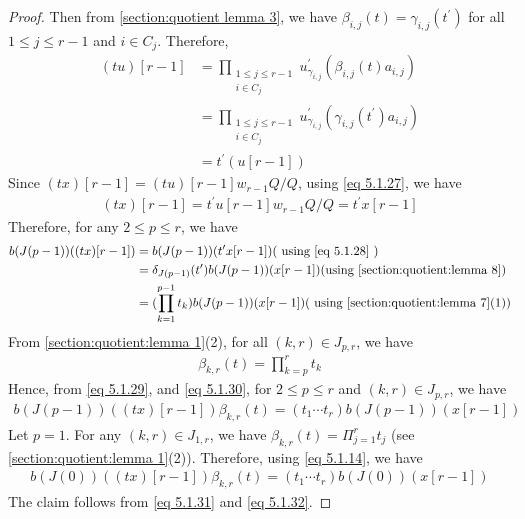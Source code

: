 \documentclass[12pt,reqno]{amsart}
\numberwithin{equation}{section}
\theoremstyle{definition}
\begin{document}
\begin{proof}
		Then from \cref{section:quotient lemma 3}, we have $\beta_{i,j}(t)=\gamma_{i,j}(t^{\prime})$ for all  $1\leq j\leq r-1$ and $i\in C_{j}$.
		Therefore, \begin{align}
			(tu)[r-1]&=\displaystyle\prod_{\substack{1\leq j\leq r-1\\i\in C_{j}}}u^{\prime}_{\gamma_{i,j}}(\beta_{i,j}(t)a_{i,j})\\
			&=\displaystyle\prod_{\substack{1\leq j\leq r-1\\i\in C_{j}}}u^{\prime}_{\gamma_{i,j}}(\gamma_{i,j}(t^{\prime})a_{i,j})\\
			&=t^{\prime}(u[r-1])\label{eq 5.1.27}
		\end{align}
		Since $(tx)[r-1]=(tu)[r-1]w_{r-1}Q/Q$, using \cref{eq 5.1.27}, we have \begin{align}\label{eq 5.1.28}
			(tx)[r-1]=t^{\prime}u[r-1]w_{r-1}Q/Q=t^{\prime}x[r-1]
		\end{align}
		Therefore, for any $2\leq p\leq r$, we have 
		\begin{align}
			b(J(p-1))((tx)[r-1])&=b(J(p-1))(t^{\prime}x[r-1]) (\text{\ using \cref{eq 5.1.28}\ })\\
			&=\delta_{J(p-1)}(t^{\prime})b(J(p-1))(x[r-1])(\text{using \cref{section:quotient:lemma 8}}) \\
			&=(\prod_{k=1}^{p-1}t_{k})b(J(p-1))(x[r-1]) (\text{\ using \cref{section:quotient:lemma 7}(1)})\label{eq 5.1.29}
		\end{align}
			From \cref{section:quotient:lemma 1}(2), for all  $(k,r)\in J_{p,r}$, we have \begin{align}\label{eq 5.1.30}
				\beta_{k,r}(t)=\prod_{k=p}^{r}t_{k}
			\end{align}
			Hence, from \cref{eq 5.1.29}, and \cref{eq 5.1.30}, for $2\leq p\leq r$ and $(k,r)\in J_{p,r}$, we have 
			\begin{align}\label{eq 5.1.31}
				b(J(p-1))((tx)[r-1])\beta_{k,r}(t)=(t_{1}\cdots t_{r})b(J(p-1))(x[r-1])
			\end{align}
			Let $p=1$. For any $(k,r)\in J_{1,r}$, we have $\beta_{k,r}(t)=\Pi_{j=1}^{r}t_{j}$ (see \cref{section:quotient:lemma 1}(2)).
			Therefore, using  \cref{eq 5.1.14}, we have  \begin{align}\label{eq 5.1.32}
				b(J(0))((tx)[r-1])\beta_{k,r}(t)=(t_{1}\cdots t_{r})b(J(0))(x[r-1])
			\end{align}
			The claim follows from \cref{eq 5.1.31} and \cref{eq 5.1.32}.
			

\end{proof}
\end{document}

